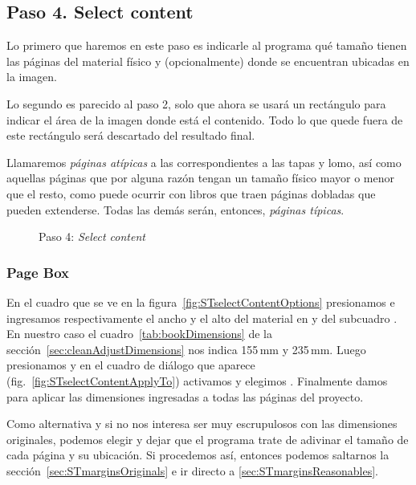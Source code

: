 \documentclass[%
	a5paper,
	10pt,
	twoside,
	openright,
	final,
]{memoir}
\begin{document}
	\subsection{Paso 4. Select content\label{sec:STselectContent}} Lo primero que haremos en este paso es indicarle al programa qué tamaño tienen las páginas del material físico y (opcionalmente) donde se encuentran ubicadas en la imagen.

	Lo segundo es parecido al paso 2, solo que ahora se usará un rectángulo para indicar el área de la imagen donde está el contenido. Todo lo que quede fuera de este rectángulo será descartado del resultado final.

	 Llamaremos \emph{páginas atípicas} a las correspondientes a las tapas y lomo, así como aquellas páginas que por alguna razón tengan un tamaño físico mayor o menor que el resto, como puede ocurrir con libros que traen páginas dobladas que pueden extenderse. Todas las demás serán, entonces, \emph{páginas típicas}.

	\begin{figure}
		\centering
		\hfill
		\caption{Paso 4: \emph{Select content}\label{fig:STselectContent}}
	\end{figure}

	\subsubsection{Page Box} En el cuadro  que se ve en la figura~\ref{fig:STselectContentOptions} presionamos  e ingresamos respectivamente el ancho y el alto del material en  y  del subcuadro . En nuestro caso el cuadro~\ref{tab:bookDimensions} de la sección~\ref{sec:cleanAdjustDimensions} nos indica 155\,mm y 235\,mm. Luego presionamos  y en el cuadro de diálogo que aparece (fig.~\ref{fig:STselectContentApplyTo}) activamos  y elegimos . Finalmente damos  para aplicar las dimensiones ingresadas a todas las páginas del proyecto.

	Como alternativa y si no nos interesa ser muy escrupulosos con las dimensiones originales, podemos elegir  y dejar que el programa trate de adivinar el tamaño de cada página y su ubicación. Si procedemos así, entonces podemos saltarnos la sección~\ref{sec:STmarginsOriginals} e ir directo a \ref{sec:STmarginsReasonables}.
\end{document}
